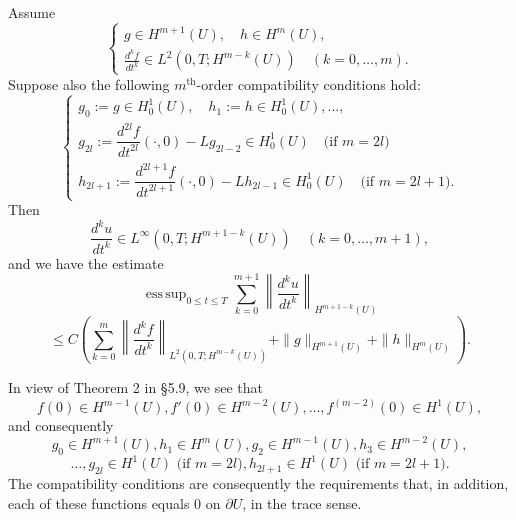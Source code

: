 \begin{theorem}
\label{thm:hyperbolic-higher-regularity}
Assume
\[
\left\{ \begin{array}{l} g \in H^{m+1}(U), \quad h \in H^m(U), \\ \frac{d^k f}{dt^k} \in L^2(0, T; H^{m-k}(U)) \quad (k = 0, \ldots, m). \end{array} \right.
\]
Suppose also the following $m^{\text{th}}$-order compatibility conditions hold:
\[
\left\{ \begin{array}{l} g_0 := g \in H^1_0(U), \quad h_1 := h \in H^1_0(U), \ldots, \\ g_{2l} := \dfrac{d^{2l}f}{dt^{2l}}(\cdot, 0) - Lg_{2l-2} \in H^1_0(U) \quad \text{(if } m = 2l\text{)} \\ h_{2l+1} := \dfrac{d^{2l+1}f}{dt^{2l+1}}(\cdot, 0) - Lh_{2l-1} \in H^1_0(U) \quad \text{(if } m = 2l + 1\text{)}. \end{array} \right.
\tag{62}
\]
Then
\[
\frac{d^k u}{dt^k} \in L^\infty(0, T; H^{m+1-k}(U)) \quad (k = 0, \ldots, m+1),
\tag{63}
\]
and we have the estimate
\[
\operatorname{ess\,sup}_{0 \le t \le T} \sum_{k=0}^{m+1} \left\| \frac{d^k u}{dt^k} \right\|_{H^{m+1-k}(U)}
\]
\[
\le C \left( \sum_{k=0}^{m} \left\| \frac{d^k f}{dt^k} \right\|_{L^2(0,T;H^{m-k}(U))} + \|g\|_{H^{m+1}(U)} + \|h\|_{H^m(U)} \right).
\tag{64}
\]
\end{theorem}

\begin{remark}
\label{rem:hyperbolic-higher-regularity-remark}
In view of Theorem 2 in \S5.9, we see that
\[
f(0) \in H^{m-1}(U), f'(0) \in H^{m-2}(U), \ldots, f^{(m-2)}(0) \in H^1(U),
\tag{65}
\]
and consequently
\[
g_0 \in H^{m+1}(U), h_1 \in H^m(U), g_2 \in H^{m-1}(U), h_3 \in H^{m-2}(U),
\]
\[
\ldots, g_{2l} \in H^1(U) \text{ (if } m = 2l\text{)}, h_{2l+1} \in H^1(U) \text{ (if } m = 2l + 1\text{)}.
\tag{66}
\]
The compatibility conditions are consequently the requirements that, in addition, each of these functions equals 0 on $\partial U$, in the trace sense.
\end{remark}

